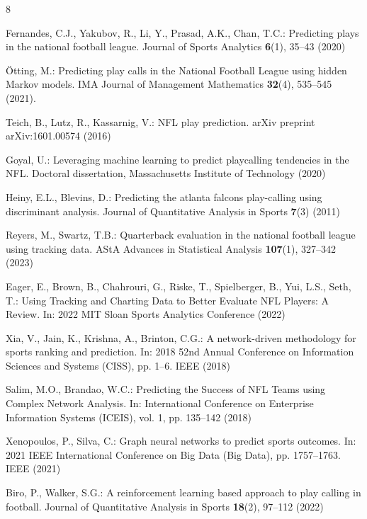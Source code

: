 \documentclass[runningheads]{llncs}
\begin{document}
\begin{thebibliography}{8}

Fernandes, C.J., Yakubov, R., Li, Y., Prasad, A.K., Chan, T.C.: Predicting plays in the national football league. Journal of Sports Analytics \textbf{6}(1), 35--43 (2020)

Ötting, M.: Predicting play calls in the National Football League using hidden Markov models. IMA Journal of Management Mathematics \textbf{32}(4), 535--545 (2021). 

Teich, B., Lutz, R., Kassarnig, V.: NFL play prediction. arXiv preprint arXiv:1601.00574 (2016)

Goyal, U.: Leveraging machine learning to predict playcalling tendencies in the NFL. Doctoral dissertation, Massachusetts Institute of Technology (2020)

Heiny, E.L., Blevins, D.: Predicting the atlanta falcons play-calling using discriminant analysis. Journal of Quantitative Analysis in Sports \textbf{7}(3) (2011)

Reyers, M., Swartz, T.B.: Quarterback evaluation in the national football league using tracking data. AStA Advances in Statistical Analysis \textbf{107}(1), 327--342 (2023)

Eager, E., Brown, B., Chahrouri, G., Riske, T., Spielberger, B., Yui, L.S., Seth, T.: Using Tracking and Charting Data to Better Evaluate NFL Players: A Review. In: 2022 MIT Sloan Sports Analytics Conference (2022)

Xia, V., Jain, K., Krishna, A., Brinton, C.G.: A network-driven methodology for sports ranking and prediction. In: 2018 52nd Annual Conference on Information Sciences and Systems (CISS), pp. 1--6. IEEE (2018)

Salim, M.O., Brandao, W.C.: Predicting the Success of NFL Teams using Complex Network Analysis. In: International Conference on Enterprise Information Systems (ICEIS), vol. 1, pp. 135--142 (2018)

Xenopoulos, P., Silva, C.: Graph neural networks to predict sports outcomes. In: 2021 IEEE International Conference on Big Data (Big Data), pp. 1757--1763. IEEE (2021)

Biro, P., Walker, S.G.: A reinforcement learning based approach to play calling in football. Journal of Quantitative Analysis in Sports \textbf{18}(2), 97--112 (2022)


\end{thebibliography}
\end{document}
